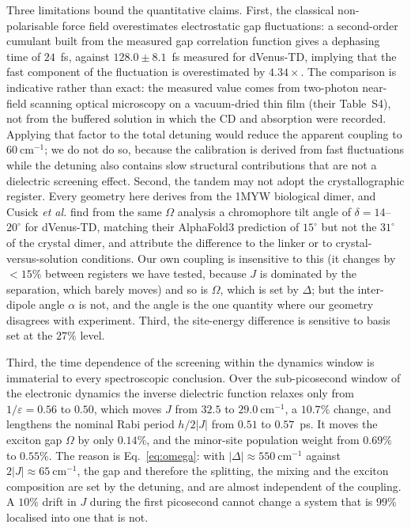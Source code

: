 \documentclass[journal=jpcbfk, manuscript=article, layout=twocolumn, doi=true]{achemso}
\begin{document}
Three limitations bound the quantitative claims. First, the classical
non-polarisable force field overestimates electrostatic gap fluctuations: a
second-order cumulant built from the measured gap correlation function gives a
dephasing time of $24$~fs, against $128.0\pm8.1$~fs measured for
dVenus-TD,\cite{nguyen2025anomalous} implying that the fast component of the
fluctuation is overestimated by $4.34\times$. The comparison is indicative
rather than exact: the measured value comes from two-photon near-field
scanning optical microscopy on a vacuum-dried thin film (their Table~S4), not
from the buffered solution in which the CD and absorption were recorded. Applying that factor to the total
detuning would reduce the apparent coupling to $60~\mathrm{cm^{-1}}$; we do not
do so, because the calibration is derived from fast fluctuations while the
detuning also contains slow structural contributions that are not a dielectric
screening effect. Second, the tandem may not adopt the crystallographic register. Every
geometry here derives from the 1MYW biological dimer, and Cusick \emph{et
al.}\cite{cusick2026twophoton} find from the same $\Omega$ analysis a
chromophore tilt angle of $\delta = 14$--$20^\circ$ for dVenus-TD, matching
their AlphaFold3 prediction of $15^\circ$ but not the $31^\circ$ of the crystal
dimer, and attribute the difference to the linker or to crystal-versus-solution
conditions. Our own coupling is insensitive to this (it changes by $<15\%$
between registers we have tested, because $J$ is dominated by the separation,
which barely moves) and so is $\Omega$, which is set by $\Delta$; but the
inter-dipole angle $\alpha$ is not, and the angle is the one quantity where our
geometry disagrees with experiment. Third, the site-energy difference is
sensitive to basis set
at the $27\%$ level.

Third, the time dependence of the screening within the dynamics window is
immaterial to every spectroscopic conclusion. Over the sub-picosecond window of
the electronic dynamics the inverse dielectric function relaxes only from
$1/\varepsilon = 0.56$ to $0.50$, which moves $J$ from $32.5$ to
$29.0~\mathrm{cm^{-1}}$, a $10.7\%$ change, and lengthens the nominal Rabi
period $h/2|J|$ from $0.51$ to $0.57$~ps. It moves the exciton gap $\Omega$ by
only $0.14\%$, and the minor-site population weight from $0.69\%$ to $0.55\%$.
The reason is Eq.~\eqref{eq:omega}: with $|\Delta| \approx 550~\mathrm{cm^{-1}}$
against $2|J| \approx 65~\mathrm{cm^{-1}}$, the gap and therefore the splitting,
the mixing and the exciton composition are set by the detuning, and are almost
independent of the coupling. A $10\%$ drift in $J$ during the first picosecond
cannot change a system that is $99\%$ localised into one that is not.
\end{document}

